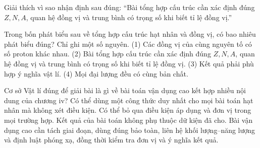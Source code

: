 \begin{bt}
Giải thích vì sao nhận định sau đúng: “Bài tổng hợp cấu trúc cần xác định đúng $Z,N,A$, quan hệ đồng vị và trung bình có trọng số khi biết tỉ lệ đồng vị.”
\end{bt}

\begin{ex}
Trong bốn phát biểu sau về tổng hợp cấu trúc hạt nhân và đồng vị, có bao nhiêu phát biểu đúng? Chỉ ghi một số nguyên. (1) Các đồng vị của cùng nguyên tố có số proton khác nhau. (2) Bài tổng hợp cấu trúc cần xác định đúng $Z,N,A$, quan hệ đồng vị và trung bình có trọng số khi biết tỉ lệ đồng vị. (3) Kết quả phải phù hợp ý nghĩa vật lí. (4) Mọi đại lượng đều có cùng bản chất.
\end{ex}

\begin{ex}
Cơ sở Vật lí đúng để giải bài là gì về bài toán vận dụng cao kết hợp nhiều nội dung của chương iv?
\choice
{Có thể dùng một công thức duy nhất cho mọi bài toán hạt nhân mà không xét điều kiện.}
{Có thể bỏ qua điều kiện áp dụng và đơn vị trong mọi trường hợp.}
{Kết quả của bài toán không phụ thuộc dữ kiện đã cho.}
{\True Bài vận dụng cao cần tách giai đoạn, dùng đúng bảo toàn, liên hệ khối lượng–năng lượng và định luật phóng xạ, đồng thời kiểm tra đơn vị và ý nghĩa kết quả.}
\end{ex}

